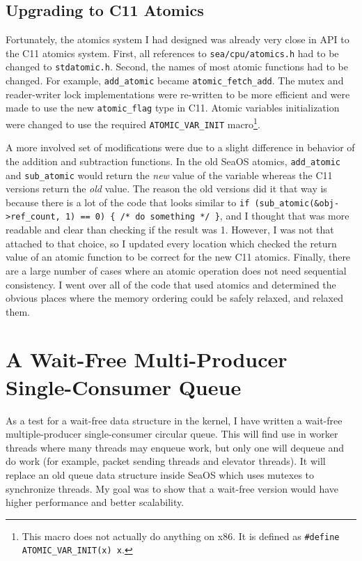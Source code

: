 \documentclass[12pt]{article}
\begin{document}
\subsection{Upgrading to C11 Atomics}

Fortunately, the atomics system I had designed was already very close in API to the C11 atomics
system. First, all references to \texttt{sea/cpu/atomics.h} had to be changed to \texttt{stdatomic.h}.
Second, the names of most atomic functions had to be changed. For example, \texttt{add\_atomic} became \texttt{atomic\_fetch\_add}.
The mutex and reader-writer lock implementations were re-written to be more efficient and were made to use
the new \texttt{atomic\_flag} type in C11. Atomic variables initialization were changed to use the
required \texttt{ATOMIC\_VAR\_INIT} macro\footnote{This macro does not actually do anything on x86. It is defined as
\mbox{\texttt{\#define ATOMIC\_VAR\_INIT(x) x}}.}.

A more involved set of modifications were due to a slight difference in behavior of the addition and subtraction
functions. In the old SeaOS atomics, \texttt{add\_atomic} and \texttt{sub\_atomic} would return the \textit{new} value of the
variable whereas the C11 versions return the \textit{old} value.
The reason the old versions did it that way is because there is a lot of the code that looks similar to
\texttt{if (sub\_atomic(\&obj->ref\_count, 1) == 0) \{ /* do something */ \}}, and I thought that was more readable and
clear than checking if the result was 1. However, I was not that attached to that choice, so I
updated every location which checked the return value of an atomic function to be correct for the new
C11 atomics.
Finally, there are a large number of cases where an atomic operation does not need sequential consistency.
I went over all of the code that used atomics and determined the obvious places where the memory ordering
could be safely relaxed, and relaxed them.

\section{A Wait-Free Multi-Producer Single-Consumer Queue}

As a test for a wait-free data structure in the kernel, I have written a wait-free multiple-producer single-consumer
circular queue. This will find use in worker threads where many threads may enqueue work, but only one will dequeue
and do work (for example, packet sending threads and elevator threads). It will replace an old queue data structure
inside SeaOS which uses mutexes to synchronize threads. My goal was to show that a wait-free version would have
higher performance and better scalability.
\end{document}

